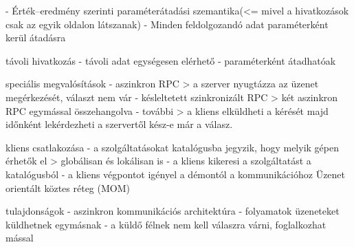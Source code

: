 \documentclass[12pt]{article}
\begin{document}
\begin{description}
                                                                        - Érték–eredmény szerinti paraméterátadási szemantika(<=  mivel a hivatkozások csak az egyik oldalon látszanak)
                                                                        - Minden feldolgozandó adat paraméterként kerül átadásra
                                                                    \item távoli hivatkozás
                                                                        - távoli adat egységesen elérhető
                                                                        - paraméterként átadhatóak
                                                                    \item speciális megvalósítások
                                                                        - aszinkron RPC
                                                                        > a szerver nyugtázza az üzenet megérkezését, választ nem vár
                                                                        - késleltetett szinkronizált RPC
                                                                        > két aszinkron RPC egymással összehangolva
                                                                        - további
                                                                        > a kliens elküldheti a kérését majd időnként lekérdezheti a szervertől kész-e már a válasz.
                                                                    \item kliens csatlakozása
                                                                        - a szolgáltatásokat katalógusba jegyzik, hogy melyik gépen érhetők el
                                                                        > globálisan és lokálisan is
                                                                        - a kliens kikeresi a szolgáltatást a katalógusból
                                                                        - a kliens végpontot igényel a démontól a kommunikációhoz
                                                                        Üzenet orientált köztes réteg (MOM)
                                                                    \item tulajdonságok
                                                                        - aszinkron kommunikációs architektúra
                                                                        - folyamatok üzeneteket küldhetnek egymásnak
                                                                        - a küldő félnek nem kell válaszra várni, foglalkozhat mással

\end{description}
\end{document}
